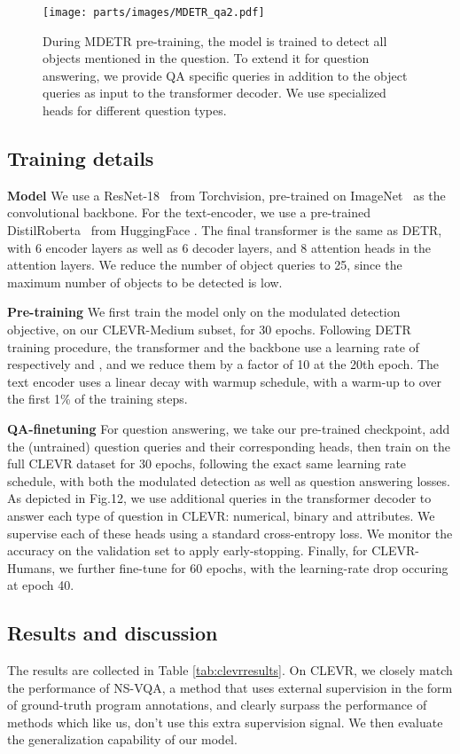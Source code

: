 \begin{figure*}
 \centering
 \texttt{[image: parts/images/MDETR\_qa2.pdf]}
 \caption{During MDETR pre-training, the model is trained to detect all objects mentioned in the question. To extend it for question answering, we provide QA specific queries in addition to the object queries as input to the transformer decoder. We use specialized heads for different question types.}
 \label{fig:QA}
\end{figure*} 

\subsection{Training details}
\label{sec:clevr_training_details}
\textbf{Model} We use a ResNet-18~\cite{he2016deep} from Torchvision, pre-trained on ImageNet~\cite{ILSVRC15} as the convolutional backbone. For the text-encoder, we use a pre-trained DistilRoberta~\cite{Sanh2019DistilBERTAD} from HuggingFace \cite{Wolf2020TransformersSN}.
The final transformer is the same as DETR, with 6 encoder layers as well as 6 decoder layers, and 8 attention heads in the attention layers. We reduce the number of object queries to 25, since the maximum number of objects to be detected is low.

\textbf{Pre-training} We first train the model only on the modulated detection objective, on our CLEVR-Medium subset, for 30 epochs. Following DETR training procedure, the transformer and the backbone use a learning rate of respectively  and , and we reduce them by a factor of 10 at the 20th epoch. The text encoder uses a linear decay with warmup schedule, with a warm-up to  over the first 1\% of the training steps. 

\textbf{QA-finetuning} For question answering, we take our pre-trained checkpoint, add the (untrained) question queries and their corresponding heads, then train on the full CLEVR dataset for 30 epochs, following the exact same learning rate schedule, with both the modulated detection as well as question answering losses.  As depicted in Fig.12, we use additional queries in the transformer decoder to answer each type of question in CLEVR: numerical, binary and attributes. We supervise each of these heads using a standard cross-entropy loss. We monitor the accuracy on the validation set to apply early-stopping. Finally, for CLEVR-Humans, we further fine-tune for 60 epochs, with the learning-rate drop occuring at epoch 40.

\subsection{Results and discussion}
The results are collected in Table \ref{tab:clevrresults}. On CLEVR, we closely match the performance of NS-VQA\cite{yiNeuralSymbolicVQADisentangling2019}, a method that uses external supervision in the form of ground-truth program annotations, and clearly surpass the performance of methods which like us, don't use this extra supervision signal. We then evaluate the generalization capability of our model. 

